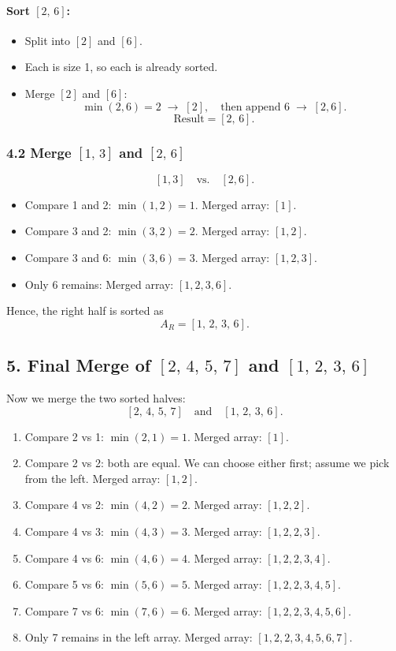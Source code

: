 \documentclass{article}
\theoremstyle{remark}
\begin{document}
\paragraph{Sort \([2,\,6]\):}
\begin{itemize}
    \item Split into \([2]\) and \([6]\).
    \item Each is size 1, so each is already sorted.
    \item Merge \([2]\) and \([6]\):
    \[
        \min(2,6) = 2 \;\rightarrow\; [2],
        \quad \text{then append } 6 \;\rightarrow\; [2,6].
    \]
    \[
        \text{Result} = [2,\,6].
    \]
\end{itemize}

\subsubsection*{4.2 Merge \([1,\,3]\) and \([2,\,6]\)}
\[
[1,3] \quad \text{vs.} \quad [2,6].
\]
\begin{itemize}
    \item Compare 1 and 2: \(\min(1,2) = 1\). Merged array: \([1]\).
    \item Compare 3 and 2: \(\min(3,2) = 2\). Merged array: \([1,2]\).
    \item Compare 3 and 6: \(\min(3,6) = 3\). Merged array: \([1,2,3]\).
    \item Only 6 remains: Merged array: \([1,2,3,6]\).
\end{itemize}
Hence, the right half is sorted as
\[
A_R = [1,\,2,\,3,\,6].
\]

\subsection*{5. Final Merge of \([2,\,4,\,5,\,7]\) and \([1,\,2,\,3,\,6]\)}

Now we merge the two sorted halves:
\[
[2,\,4,\,5,\,7] \quad \text{and} \quad [1,\,2,\,3,\,6].
\]
\begin{enumerate}
    \item Compare 2 vs 1: \(\min(2,1) = 1\). Merged array: \([1]\).
    \item Compare 2 vs 2: both are equal. We can choose either first; assume we pick from the left. Merged array: \([1,2]\).
    \item Compare 4 vs 2: \(\min(4,2) = 2\). Merged array: \([1,2,2]\).
    \item Compare 4 vs 3: \(\min(4,3) = 3\). Merged array: \([1,2,2,3]\).
    \item Compare 4 vs 6: \(\min(4,6) = 4\). Merged array: \([1,2,2,3,4]\).
    \item Compare 5 vs 6: \(\min(5,6) = 5\). Merged array: \([1,2,2,3,4,5]\).
    \item Compare 7 vs 6: \(\min(7,6) = 6\). Merged array: \([1,2,2,3,4,5,6]\).
    \item Only 7 remains in the left array. Merged array: \([1,2,2,3,4,5,6,7]\).
\end{enumerate}
\end{document}
